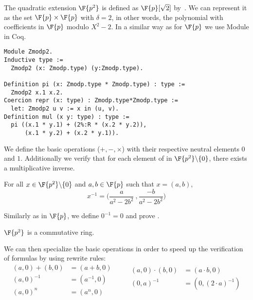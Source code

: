 The quadratic extension $\F{p^2}$ is defined as $\F{p}[\sqrt{2}]$ by~\cite{Ber06}.
We can represent it as the set $\F{p} \times \F{p}$ with $\delta = 2$, in other words,
the polynomial with coefficients in $\F{p}$ modulo $X^2 - 2$. In a similar way
as for $\F{p}$ we use Module in Coq.
\begin{lstlisting}[language=Coq]
Module Zmodp2.
Inductive type :=
  Zmodp2 (x: Zmodp.type) (y:Zmodp.type).

Definition pi (x: Zmodp.type * Zmodp.type) : type :=
  Zmodp2 x.1 x.2.
Coercion repr (x: type) : Zmodp.type*Zmodp.type :=
  let: Zmodp2 u v := x in (u, v).
Definition mul (x y: type) : type :=
  pi ((x.1 * y.1) + (2%:R * (x.2 * y.2)),
      (x.1 * y.2) + (x.2 * y.1)).
\end{lstlisting}

We define the basic operations ($+, -, \times$) with their respective neutral
elements $0$ and $1$. Additionally we verify that for each element of in
$\F{p^2}\backslash\{0\}$, there exists a multiplicative inverse.
\begin{lemma}
  \label{lemma:Zmodp2_inv}
  For all $x \in \F{p^2}\backslash\{0\}$ and $a,b \in \F{p}$ such that $x = (a,b)$,
  $$x^{-1} = \Big(\frac{a}{a^2-2b^2}\ , \frac{-b}{a^2-2b^2}\Big)$$
\end{lemma}
Similarly as in $\F{p}$, we define $0^{-1} = 0$ and prove .
\begin{lemma}
  \label{lemma:Zmodp2_ring}
  $\F{p^2}$ is a commutative ring.
\end{lemma}

We can then specialize the basic operations in order to speed up the verification
of formulas by using rewrite rules:
\begin{equation*}
\begin{split}
(a,0) + (b,0) &= (a+b, 0)\\
(a, 0)^{-1} &= (a^{-1}, 0)\\
(a, 0)^n &= (a^n, 0)\\
\end{split}
\qquad
\begin{split}
(a,0) \cdot   (b,0) &= (a \cdot b, 0)\\
(0,a)^{-1} &= (0,(2\cdot a)^{-1})\\
~\\
\end{split}
\end{equation*}




